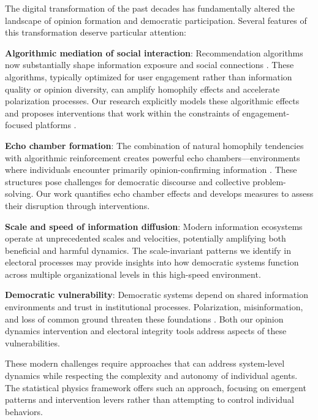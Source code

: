The digital transformation of the past decades has fundamentally altered the landscape of opinion formation and democratic participation. Several features of this transformation deserve particular attention:

\textbf{Algorithmic mediation of social interaction}: Recommendation algorithms now substantially shape information exposure and social connections \cite{link-recommendation-algorithms-and-dynamics-of-polarization-in-social-networks}. These algorithms, typically optimized for user engagement rather than information quality or opinion diversity, can amplify homophily effects and accelerate polarization processes. Our research explicitly models these algorithmic effects and proposes interventions that work within the constraints of engagement-focused platforms \cite{depolarization-of-echo-chambers-by-random-dynamical-nudge}.

\textbf{Echo chamber formation}: The combination of natural homophily tendencies \cite{birds-of-a-feather-homophily-in-social-networks} with algorithmic reinforcement creates powerful echo chambers—environments where individuals encounter primarily opinion-confirming information \cite{echo-chambers-online, echo-chambers-emotional-contagion-and-group-polarization-on-facebook}. These structures pose challenges for democratic discourse and collective problem-solving. Our work quantifies echo chamber effects and develops measures to assess their disruption through interventions.

\textbf{Scale and speed of information diffusion}: Modern information ecosystems operate at unprecedented scales and velocities, potentially amplifying both beneficial and harmful dynamics. The scale-invariant patterns we identify in electoral processes may provide insights into how democratic systems function across multiple organizational levels in this high-speed environment.

\textbf{Democratic vulnerability}: Democratic systems depend on shared information environments and trust in institutional processes. Polarization, misinformation, and loss of common ground threaten these foundations \cite{homophily-and-polarization-in-the-age-of-misinformation}. Both our opinion dynamics intervention and electoral integrity tools address aspects of these vulnerabilities.

These modern challenges require approaches that can address system-level dynamics while respecting the complexity and autonomy of individual agents. The statistical physics framework offers such an approach, focusing on emergent patterns and intervention levers rather than attempting to control individual behaviors.

